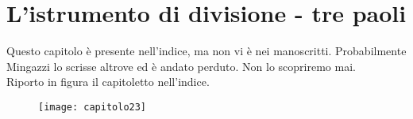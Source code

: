 

\chapter{L'istrumento di divisione - tre paoli}

Questo capitolo è presente nell'indice, ma non vi è nei manoscritti. Probabilmente Mingazzi lo scrisse altrove ed è andato perduto. Non lo scopriremo mai.\\

Riporto in figura il capitoletto nell'indice.
 \begin{figure}[htb]
    \centering
    \texttt{[image: capitolo23]}
\end{figure}